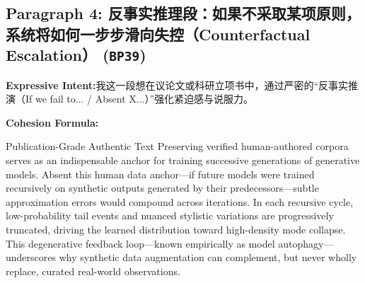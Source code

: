 \subsection*{Paragraph 4: 反事实推理段：如果不采取某项原则，系统将如何一步步滑向失控（Counterfactual Escalation） (\texttt{BP39})}
\noindent\textbf{Expressive Intent:}\enspace 我这一段想在议论文或科研立项书中，通过严密的“反事实推演（If we fail to... / Absent X...）”强化紧迫感与说服力。\par
\noindent\textbf{Cohesion Formula:}\par\vspace{4pt}
\begin{ExampleBox}{Publication-Grade Authentic Text}
Preserving verified human-authored corpora serves as an indispensable anchor for training successive generations of generative models. Absent this human data anchor---if future models were trained recursively on synthetic outputs generated by their predecessors---subtle approximation errors would compound across iterations. In each recursive cycle, low-probability tail events and nuanced stylistic variations are progressively truncated, driving the learned distribution toward high-density mode collapse. This degenerative feedback loop---known empirically as model autophagy---underscores why synthetic data augmentation can complement, but never wholly replace, curated real-world observations.
\end{ExampleBox}
